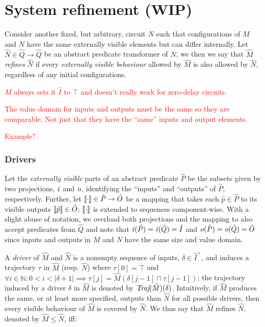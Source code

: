 \section{System refinement (WIP)}

Consider another fixed, but arbitrary, circuit $N$ such that configurations of $M$ and $N$ have the same externally visible elements but can differ internally. Let $\hat N \in \hat Q \rightarrow \hat Q$ be an abstract predicate transformer of $N$, we then we say that $\hat M$ \textit{refines} $\hat N$ if every \textit{externally visible behaviour} allowed by $\hat M$ is also allowed by $\hat N$, regardless of any initial configurations.

\textcolor{red}{$M$ always sets it $\hat I$ to $\top$ and doesn't really work for zero-delay circuits.}

\textcolor{red}{The value domain for inputs and outputs must be the same so they are comparable. Not just that they have the ``same'' inputs and output elements.}

\textcolor{red}{Example?}

\subsubsection{Drivers} Let the \textit{externally visible} parts of an abstract predicate $\hat P$ be the subsets given by two projections, $\mathit{i}$ and $\mathit{o}$, identifying the ``inputs'' and ``outputs'' of $\hat P$, respectively. Further, let $\llbracket\cdot\rrbracket \in \hat P \rightarrow \hat O$ be a mapping that takes each $\hat p \in \hat P$ to its visible outputs $\llbracket\hat p\rrbracket \in \hat O$; $\llbracket\cdot\rrbracket$ is extended to sequences component-wise. With a slight abuse of notation, we overload both projections and the mapping to also accept predicates from $\hat Q$ and note that $\mathit{i}(\hat P) = \mathit{i}(\hat Q) = \hat I$ and $\mathit{o}(\hat P) = \mathit{o}(\hat Q) = \hat O$ since inputs and outputs in $M$ and $N$ have the same size and value domain.

A \textit{driver} of $\hat M$ and $\hat N$ is a nonempty sequence of inputs, $\delta \in \hat I^{+}$, and induces a trajectory $\tau$ in $\hat M$ (resp. $\hat N$) where $\tau[0] = \top$ and $\forall i \in \mathbb{N} : 0 < i < | \delta + 1 | \implies \tau[j] = \hat M(\delta[j-1] \sqcap \tau[j-1])$; the trajectory induced by a driver $\delta$ in $\hat M$ is denoted by $\textit{Traj}(\hat M)(\delta)$. Intuitively, if $\hat M$ produces the same, or at least more specified, outputs than $\hat N$ for all possible drivers, then every visible behaviour of $\hat M$ is covered by $\hat N$. We thus say that $\hat M$ refines $\hat N$, denoted by $\hat M \leq \hat N$, iff:

